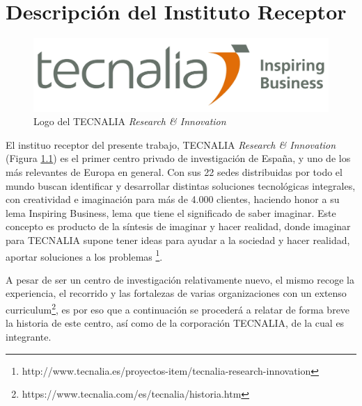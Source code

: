 \chapter{Descripción del Instituto Receptor}\label{sec:capitulo2}
\thispagestyle{empty}

\begingroup
{}
\small
\endgroup
\begin{figure}
	\begin{center}
		\includegraphics[scale=.6]{Imagenes/tecnaliar}
		\caption{Logo del TECNALIA \textit{ Research \& Innovation}}
		\label{fig:tecnaliar}
	\end{center}
\end{figure}
El instituo receptor del presente trabajo, TECNALIA \textit{Research \& Innovation} (Figura \ref{fig:tecnaliar}) es el primer centro privado de investigación de España, y uno de los más relevantes de Europa en general. Con sus 22 sedes distribuidas por todo el mundo buscan identificar y desarrollar distintas soluciones tecnológicas integrales, con creatividad e imaginación para más de 4.000 clientes, haciendo honor a su lema Inspiring Business, lema que tiene el significado de saber imaginar. Este concepto es producto de la síntesis de imaginar y hacer realidad, donde imaginar para TECNALIA supone tener ideas para ayudar a la sociedad y hacer realidad, aportar soluciones a los problemas \footnote{ http://www.tecnalia.es/proyectos-item/tecnalia-research-innovation }.\\    

\par A pesar de ser un centro de investigación relativamente nuevo, el mismo recoge la experiencia, el recorrido y las fortalezas de varias organizaciones con un extenso curriculum\footnote{https://www.tecnalia.com/es/tecnalia/historia.htm}, es por eso que a continuación se procederá a relatar de forma breve la historia de este centro, así como de la corporación TECNALIA, de la cual es integrante.

